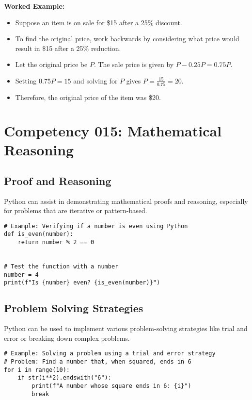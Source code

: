 \documentclass{book}
\begin{document}
\textbf{Worked Example:}
\begin{itemize}
        \item Suppose an item is on sale for \$15 after a 25\% discount.
        \item To find the original price, work backwards by considering what price would result in \$15 after a 25\% reduction.
        \item Let the original price be \(P\). The sale price is given by \(P - 0.25P = 0.75P\).
        \item Setting \(0.75P = 15\) and solving for \(P\) gives \(P = \frac{15}{0.75} = 20\).
        \item Therefore, the original price of the item was \$20.
\end{itemize}


\section{Competency 015: Mathematical Reasoning}
\subsection{Proof and Reasoning}
Python can assist in demonstrating mathematical proofs and reasoning, especially for problems that are iterative or pattern-based.


\begin{lstlisting}[style=pythonstyle]
# Example: Verifying if a number is even using Python
def is_even(number):
    return number % 2 == 0


# Test the function with a number
number = 4
print(f"Is {number} even? {is_even(number)}")
\end{lstlisting}


\subsection{Problem Solving Strategies}
Python can be used to implement various problem-solving strategies like trial and error or breaking down complex problems.


\begin{lstlisting}[style=pythonstyle]
# Example: Solving a problem using a trial and error strategy
# Problem: Find a number that, when squared, ends in 6
for i in range(10):
    if str(i**2).endswith("6"):
        print(f"A number whose square ends in 6: {i}")
        break
\end{lstlisting}
\end{document}
